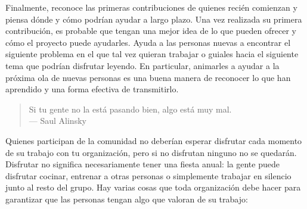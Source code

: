 Finalmente,
reconoce las primeras contribuciones de quienes recién comienzan
y piensa dónde y cómo podrían ayudar a largo plazo.
Una vez realizada su primera contribución,
es probable que tengan una mejor idea de lo que pueden ofrecer
y cómo el proyecto puede ayudarles.
Ayuda a las personas nuevas a encontrar el siguiente problema en el que tal vez quieran trabajar
o guiales hacia el siguiente tema que podrían disfrutar leyendo.
En particular,
animarles a ayudar a la próxima ola de nuevas personas
es una buena manera de reconocer lo que han aprendido
y una forma efectiva de transmitirlo.


\begin{quote}

 Si tu gente no la está pasando bien, algo está muy mal.\\
  --- Saul Alinsky

\end{quote}

Quienes participan de la comunidad no deberían esperar disfrutar cada momento de su trabajo con tu organización,
pero si no disfrutan ninguno
no se quedarán.
Disfrutar no significa necesariamente tener una fiesta anual:
la gente puede disfrutar cocinar,
entrenar a otras personas
o simplemente trabajar en silencio junto al resto del grupo.
Hay varias cosas que toda organización debe hacer para garantizar
que las personas tengan algo que valoran de su trabajo:

